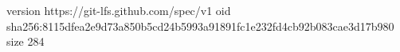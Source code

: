 version https://git-lfs.github.com/spec/v1
oid sha256:8115dfea2e9d73a850b5cd24b5993a91891fc1e232fd4cb92b083cae3d17b980
size 284
